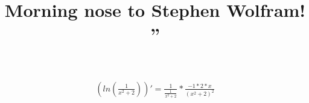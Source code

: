 \documentclass{article}
\title{Morning nose to Stephen Wolfram! ”}
\begin{document}
\maketitle
\begin{eqnarray}
\left( ln\left(\frac{{1}}{{{{x}}^{{2}}+{2}}}\right)\right) ' = 
{\frac{{1}}{\frac{{1}}{{{{x}}^{{2}}+{2}}}}*\frac{{{-1}*{{2}*{x}}}}{{\left({{{x}}^{{2}}+{2}}\right)}^{{2}}}}\end{eqnarray}
\end{document}
